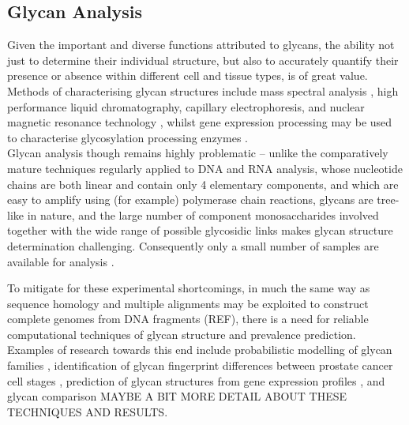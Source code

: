 \documentclass[12pt,a4paper]{article}
\begin{document}






\subsection{Glycan Analysis}
\label{sec:glycan_analysis}

Given the important and diverse functions attributed to glycans, the ability not just to determine their individual structure, but also to accurately quantify their presence or absence within different cell and tissue types, is of great value. Methods of characterising glycan structures include mass spectral analysis \citep{10.1371/journal.pcbi.1002813}, high performance liquid chromatography, capillary electrophoresis, and nuclear magnetic resonance technology \citep{von2004bioinformatics}, whilst gene expression processing may be used to characterise glycosylation processing enzymes \citep{10.1371/journal.pcbi.1002813}.\\

Glycan analysis though remains highly problematic -- unlike the comparatively mature techniques regularly applied to DNA and RNA analysis, whose nucleotide chains are both linear and contain only 4 elementary components, and which are easy to amplify using (for example) polymerase chain reactions, glycans are tree-like in nature, and the large number of component monosaccharides involved together with the wide range of possible glycosidic links makes glycan structure determination challenging. Consequently only a small number of samples are available for analysis \citep{doi:10.1093/bioinformatics/bti666}.

To mitigate for these experimental shortcomings, in much the same way as sequence homology and multiple alignments may be exploited to construct complete genomes from DNA fragments (REF), there is a need for reliable computational techniques of glycan structure and prevalence prediction. Examples of research towards this end include probabilistic modelling of glycan families \citep{ueda2005probabilistic}, identification of glycan fingerprint differences between prostate cancer cell stages \citep{10.1371/journal.pcbi.1002813}, prediction of glycan structures from gene expression profiles \citep{doi:10.1093/bioinformatics/bti666}, and glycan comparison \citep{aoki2004score, aoki2004kcam} MAYBE A BIT MORE DETAIL ABOUT THESE TECHNIQUES AND RESULTS.
\end{document}
